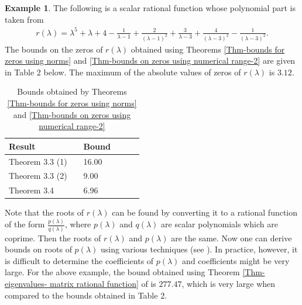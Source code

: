 \documentclass[12pt, reqno]{amsart}
\theoremstyle{definition}
\newtheorem{example}[theorem]{Example}
\theoremstyle{remark}
\numberwithin{equation}{section}
\begin{document}
\begin{example}\label{example-4.2}
The following is a scalar rational function whose polynomial part 
is taken from \cite{Abdelkader-Faud-Soumia}
\begin{align*}
r(\lambda) = \lambda^5 + \lambda +4- \displaystyle \frac{1}{\lambda -1}+ 
\frac{2}{(\lambda -1)^2}+\frac{3}{\lambda -3}+\frac{4}{(\lambda -3)^2}-
\frac{1}{(\lambda -3)^2}.
\end{align*}
The bounds on the zeros of $r(\lambda)$ obtained using Theorems 
\ref{Thm-bounds for zeros using norms} and 
\ref{Thm-bounds on zeros using numerical range-2} are given in Table $2$ below. 
The maximum of the absolute values of zeros of $r(\lambda)$ is $3.12$.

\begin{table}[h!]
\centering
\begin{tabular}{l l l l l l}
\hline
Result & \hspace{5cm} & Bound \\ [0.5ex] 
\hline

Theorem 3.3 (1) & \hspace{5cm} & 16.00\\
Theorem 3.3 (2) & \hspace{5cm} & 9.00\\
Theorem 3.4 & \hspace{5cm} & 6.96\\[1ex] 
\hline
\end{tabular}
\vspace{0.2cm}
\caption{Bounds obtained by Theorems \ref{Thm-bounds for zeros using norms} and 
\ref{Thm-bounds on zeros using numerical range-2}}
\label{table:2}
\end{table} 

Note that the roots of $r(\lambda)$ can be found by converting it to a 
rational function of the form $\displaystyle \frac{p(\lambda)}{q(\lambda)}$, 
where $p(\lambda)$ and $q(\lambda)$ are scalar polynomials which are coprime. 
Then the roots of $r(\lambda)$ and $p(\lambda)$ are the same. Now one can derive 
bounds on roots of $p(\lambda)$ using various techniques 
(see \cite{Abdelkader-Faud-Soumia}). In practice, however, it is difficult 
to determine the coefficients of $p(\lambda)$ and coefficients might be very 
large. For the above example, the bound obtained using Theorem 
\ref{Thm- eigenvalues- matrix rational function} of 
\cite{Abdelkader-Faud-Soumia} is $277.47$, which is very large when compared 
to the bounds obtained in Table $2$. 

\end{example}
\end{document}
